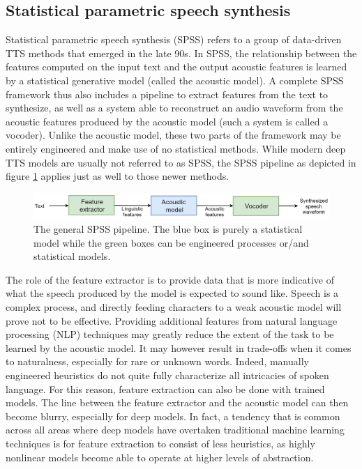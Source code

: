 \documentclass[a4paper, oneside, 12pt, english]{article}
\begin{document}
\subsection{Statistical parametric speech synthesis} \label{SPSS}
Statistical parametric speech synthesis (SPSS) refers to a group of data-driven TTS methods that emerged in the late 90s. In SPSS, the relationship between the features computed on the input text and the output acoustic features is learned by a statistical generative model (called the acoustic model). A complete SPSS framework thus also includes a pipeline to extract features from the text to synthesize, as well as a system able to reconstruct an audio waveform from the acoustic features produced by the acoustic model (such a system is called a vocoder). Unlike the acoustic model, these two parts of the framework may be entirely engineered and make use of no statistical methods. While modern deep TTS models are usually not referred to as SPSS, the SPSS pipeline as depicted in figure \ref{spss_framework} applies just as well to those newer methods.

\begin{figure}[h]
	\centering
	\includegraphics[width=\linewidth]{images/spss_framework.png}
	\caption{The general SPSS pipeline. The blue box is purely a statistical model while the green boxes can be engineered processes or/and statistical models.}
	\label{spss_framework}
\end{figure}

The role of the feature extractor is to provide data that is more indicative of what the speech produced by the model is expected to sound like. Speech is a complex process, and directly feeding characters to a weak acoustic model will prove not to be effective. Providing additional features from natural language processing (NLP) techniques may greatly reduce the extent of the task to be learned by the acoustic model. It may however result in trade-offs when it comes to naturalness, especially for rare or unknown words. Indeed, manually engineered heuristics do not quite fully characterize all intricacies of spoken language. For this reason, feature extraction can also be done with trained models. The line between the feature extractor and the acoustic model can then become blurry, especially for deep models. In fact, a tendency that is common across all areas where deep models have overtaken traditional machine learning techniques is for feature extraction to consist of less heuristics, as highly nonlinear models become able to operate at higher levels of abstraction.
\end{document}
